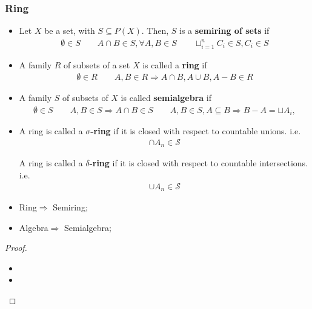 \documentclass[Total.tex]{subfiles}
\begin{document}
				\subsubsection{Ring}
					\begin{Def}
						\begin{itemize}
							\item Let $X$ be a set, with $S\subseteq P(X)$. Then, $S$ is a \textbf{semiring of sets} if
							\begin{gather*}
								\emptyset\in S\qquad A\cap B\in S,\forall A,B\in S\qquad 
								\sqcup_{i=1}^n C_i\in S,C_i\in S
							\end{gather*}
							\item A family $R$ of subsets of a set $X$ is called a \textbf{ring} if
							\begin{gather*}
								\emptyset\in R\qquad A,B\in R\Rightarrow A\cap B,A\cup B,A-B\in R
							\end{gather*}
							\item A family $S$ of subsets of $X$ is called \textbf{semialgebra} if
							\begin{gather*}
								\emptyset\in S\qquad A,B\in S\Rightarrow A\cap B\in S\qquad A,B\in S,A\subseteq B\Rightarrow B-A=\sqcup A_i,
							\end{gather*}
							\item A ring is called a \textbf{$\sigma$-ring} if it is closed with respect to countable unions. i.e. 
							\begin{gather*}
								\cap A_n\in \mathcal{S}
							\end{gather*}
							
							A ring is called a \textbf{$\delta$-ring} if it is closed with respect to countable intersections. i.e.
							\begin{gather*}
								\cup A_n\in \mathcal{S}
							\end{gather*}
						\end{itemize}
					\end{Def}
					
					\begin{proposition}
						\begin{itemize}
							\item Ring$\Rightarrow$ Semiring;
							\item Algebra$\Rightarrow$ Semialgebra;
						\end{itemize}
					\end{proposition}
					\begin{proof}
						\begin{itemize}
							\item 
							\item 
						\end{itemize}
					\end{proof}
					
\end{document}
